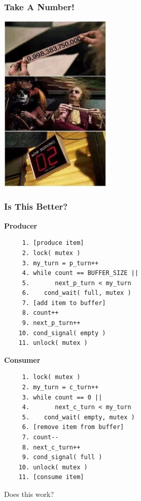 \begin{frame}
	\frametitle{Take A Number!}

	\begin{center}
		\includegraphics[width=0.4\textwidth]{images/now_serving}
	\end{center}
\end{frame}

\begin{frame}[fragile]
	\frametitle{Is This Better?}

	\begin{multicols}{2}
		\small
		\textbf{Producer}
		\begin{verbatim}
	 1. [produce item]
	 2. lock( mutex )
	 3. my_turn = p_turn++
	 4. while count == BUFFER_SIZE ||
	 5.       next_p_turn < my_turn
	 6.    cond_wait( full, mutex )
	 7. [add item to buffer]
	 8. count++
	 9. next_p_turn++
	10. cond_signal( empty )
	11. unlock( mutex )
		\end{verbatim}
		\columnbreak
		\textbf{Consumer}\vspace{-2em}
		\begin{verbatim}
	 1. lock( mutex )
	 2. my_turn = c_turn++
	 3. while count == 0 ||
	 4.       next_c_turn < my_turn
	 5.    cond_wait( empty, mutex )
	 6. [remove item from buffer]
	 7. count--
	 8. next_c_turn++
	 9. cond_signal( full )
	10. unlock( mutex )
	11. [consume item]
		\end{verbatim}
	\end{multicols}
	\vspace{-2em}

	Does this work?

\end{frame}

